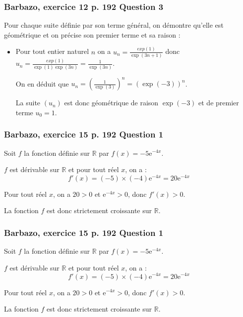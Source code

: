 \documentclass[11pt, hyperref={urlcolor=red,%
            linkcolor=blue, %
            colorlinks=true}]{beamer}
\newcommand{\R}{\mathbb{R}}
\begin{document}
\begin{frame}
\frametitle{Barbazo, exercice 12 p. 192 Question 3}
\label{exo12}
Pour chaque suite définie par son terme général, on démontre qu'elle est géométrique et on précise son premier terme et sa raison :

\begin{itemize}

	
		\item Pour tout entier naturel $n$ on a $u_{n}=\frac{exp(1)}{\exp(3n+1)}$ donc  $u_{n}=\frac{exp(1)}{\exp(1)\exp(3n)}=\frac{1}{\exp(3n)}$.
		
On en déduit que  $u_{n}=\left(\frac{1}{\exp(3)}\right)^{n}=\left(\exp(-3)\right)^{n}$.
	
	La suite $\left(u_{n}\right)$ est donc géométrique de raison $\exp(-3)$ et de premier terme $u_{0}=1$.
	
	
	
\end{itemize}


\end{frame}

\begin{frame}
\frametitle{Barbazo, exercice 15 p. 192 Question 1}
\label{exo15}

Soit $f$ la fonction définie sur $\R$ par $f(x)=-5\text{e}^{-4x}$.

$f$ est dérivable sur $\R$ et pour tout réel $x$, on a :
\begin{equation*}
f'(x)=(-5)\times(-4)\text{e}^{-4x}=20\text{e}^{-4x}
\end{equation*}


Pour tout réel $x$, on a $20>0$ et $\text{e}^{-4x}>0$, donc $f'(x)>0$.

La fonction $f$ est donc strictement croissante sur $\R$.
\end{frame}


\begin{frame}
\frametitle{Barbazo, exercice 15 p. 192 Question 1}
\label{exo15}

Soit $f$ la fonction définie sur $\R$ par $f(x)=-5\text{e}^{-4x}$.

$f$ est dérivable sur $\R$ et pour tout réel $x$, on a :
\begin{equation*}
f'(x)=(-5)\times(-4)\text{e}^{-4x}=20\text{e}^{-4x}
\end{equation*}


Pour tout réel $x$, on a $20>0$ et $\text{e}^{-4x}>0$, donc $f'(x)>0$.

La fonction $f$ est donc strictement croissante sur $\R$.
\end{frame}
\end{document}

